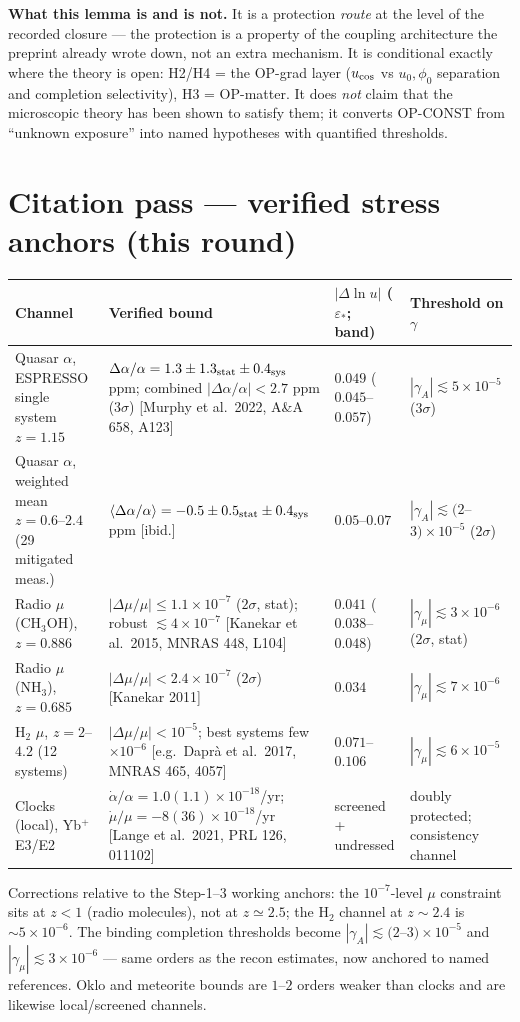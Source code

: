 \documentclass[11pt,a4paper]{article}
\begin{document}
\textbf{What this lemma is and is not.} It is a protection \emph{route} at the
level of the recorded closure --- the protection is a property of the coupling
architecture the preprint already wrote down, not an extra mechanism. It is
conditional exactly where the theory is open: H2/H4 = the OP-grad layer
($u_{\rm cos}$ vs $u_0,\phi_0$ separation and completion selectivity), H3 =
OP-matter. It does \emph{not} claim that the microscopic theory has been shown
to satisfy them; it converts OP-CONST from ``unknown exposure'' into named
hypotheses with quantified thresholds.

\section{Citation pass --- verified stress anchors (this round)}
\renewcommand{\arraystretch}{1.2}\small
\begin{longtable}{@{}p{3.4cm}p{4.7cm}p{2.2cm}p{3.0cm}@{}}
\toprule \textbf{Channel} & \textbf{Verified bound} & $|\Delta\ln u|$
($\varepsilon_*$; band) & \textbf{Threshold on $\gamma$} \\ \midrule \endhead
\bottomrule \endfoot
Quasar $\alpha$, ESPRESSO single system $z=1.15$ & $\Delta\alpha/\alpha=
1.3\pm1.3_{\rm stat}\pm0.4_{\rm sys}$ ppm; combined $|\Delta\alpha/\alpha|<2.7$
ppm ($3\sigma$) [Murphy et al.\ 2022, A\&A 658, A123] & $0.049$
($0.045$--$0.057$) & $|\gamma_A|\lesssim5\times10^{-5}$ ($3\sigma$) \\
Quasar $\alpha$, weighted mean $z=0.6$--$2.4$ (29 mitigated meas.) &
$\langle\Delta\alpha/\alpha\rangle=-0.5\pm0.5_{\rm stat}\pm0.4_{\rm sys}$ ppm
[ibid.] & $0.05$--$0.07$ & $|\gamma_A|\lesssim(2$--$3)\times10^{-5}$
($2\sigma$) \\
Radio $\mu$ (CH$_3$OH), $z=0.886$ & $|\Delta\mu/\mu|\le1.1\times10^{-7}$
($2\sigma$, stat); robust $\lesssim4\times10^{-7}$ [Kanekar et al.\ 2015, MNRAS
448, L104] & $0.041$ ($0.038$--$0.048$) & $|\gamma_\mu|\lesssim3\times10^{-6}$
($2\sigma$, stat) \\
Radio $\mu$ (NH$_3$), $z=0.685$ & $|\Delta\mu/\mu|<2.4\times10^{-7}$ ($2\sigma$)
[Kanekar 2011] & $0.034$ & $|\gamma_\mu|\lesssim7\times10^{-6}$ \\
H$_2$ $\mu$, $z=2$--$4.2$ (12 systems) & $|\Delta\mu/\mu|<10^{-5}$; best systems
few$\times10^{-6}$ [e.g.\ Dapr\`a et al.\ 2017, MNRAS 465, 4057] & $0.071$--
$0.106$ & $|\gamma_\mu|\lesssim6\times10^{-5}$ \\
Clocks (local), Yb$^+$ E3/E2 & $\dot\alpha/\alpha=1.0(1.1)\times10^{-18}$/yr;
$\dot\mu/\mu=-8(36)\times10^{-18}$/yr [Lange et al.\ 2021, PRL 126, 011102] &
screened + undressed & doubly protected; consistency channel \\
\end{longtable}\normalsize
Corrections relative to the Step-1--3 working anchors: the $10^{-7}$-level $\mu$
constraint sits at $z<1$ (radio molecules), not at $z\simeq2.5$; the H$_2$
channel at $z\sim2.4$ is $\sim5\times10^{-6}$. The binding completion thresholds
become $|\gamma_A|\lesssim(2$--$3)\times10^{-5}$ and
$|\gamma_\mu|\lesssim3\times10^{-6}$ --- same orders as the recon estimates, now
anchored to named references. Oklo and meteorite bounds are $1$--$2$ orders
weaker than clocks and are likewise local/screened channels.
\end{document}

